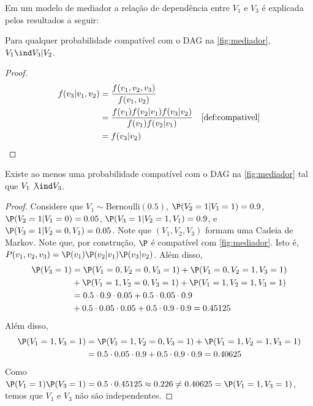 Em um modelo de mediador 
a relação de dependência entre 
$V_1$ e $V_3$ é explicada pelos
resultados a seguir:

\begin{lemma}
 \label{lem:med-ind}
 Para qualquer probabilidade compatível com 
 o DAG na \cref{fig:mediador},
 $V_1 \ind V_3 | V_2$.
\end{lemma}

\begin{proof}
 \begin{align*}
  f(v_3|v_1,v_2) 
  &= \frac{f(v_1,v_2,v_3)}{f(v_1,v_2)} \\
  &= \frac{f(v_1)f(v_2|v_1)f(v_3|v_2)}{f(v_1)f(v_2|v_1)} 
  & \text{\cref{def:compativel}} \\
  &= f(v_3|v_2)
 \end{align*}
\end{proof}

\begin{lemma}
 \label{lem:med-dep}
 Existe ao menos uma probabilidade compatível com
 o DAG na \cref{fig:mediador} tal que
 $V_1 \not\ind V_3$.
\end{lemma}

\begin{proof}
 Considere que $V_1 \sim \text{Bernoulli}(0.5)$,
 $\P(V_2=1|V_1=1)=0.9$, $\P(V_2=1|V_1=0)=0.05$,
 $\P(V_3=1|V_2=1,V_1)=0.9$, e $\P(V_3=1|V_2=0,V_1)=0.05$.
 Note que $(V_1,V_2,V_3)$ formam uma Cadeia de Markov.
 Note que, por construção, $\P$ é 
 compatível com \cref{fig:mediador}.
 Isto é, $P(v_1,v_2,v_3) = \P(v_1)\P(v_2|v_1)\P(v_3|v_2)$.
 Além disso,
 \begin{align*}
  \P(V_3 = 1) &= \P(V_1=0, V_2=0, V_3=1) + \P(V_1=0, V_2=1, V_3=1) \\
              &+ \P(V_1=1, V_2=0, V_3=1) + \P(V_1=1, V_2=1, V_3=1) \\
              &= 0.5 \cdot 0.9 \cdot 0.05 + 0.5 \cdot 0.05 \cdot 0.9 \\
              &+ 0.5 \cdot 0.05 \cdot 0.05 + 0.5 \cdot 0.9 \cdot 0.9 
              = 0.45125
 \end{align*}
 Além disso,
 \begin{align*}
  \P(V_1 = 1, V_3 = 1)
  &= \P(V_1 = 1, V_2 = 0, V_3 = 1) 
  +  \P(V_1 = 1, V_2 = 1, V_3 = 1) \\
  &= 0.5 \cdot 0.05 \cdot 0.9 + 0.5 \cdot 0.9 \cdot 0.9
  = 0.40625
 \end{align*}
 Como $\P(V_1=1)\P(V_3=1) = 0.5 \cdot 0.45125 \approx 0.226 \neq 
 0.40625 = \P(V_1=1,V_3=1)$,
 temos que $V_1$ e $V_3$ não são independentes.
\end{proof}

